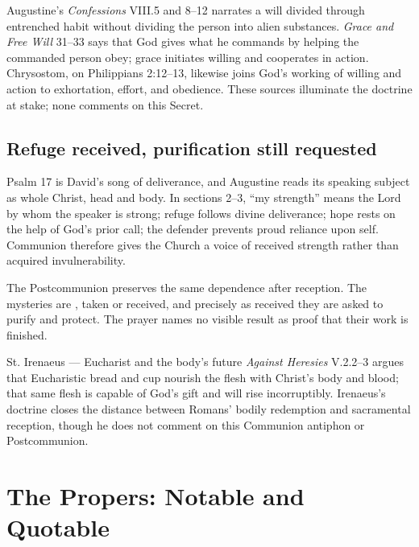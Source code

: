 Augustine's \emph{Confessions} VIII.5 and 8--12 narrates a will divided through entrenched habit without dividing the person into alien substances. \emph{Grace and Free Will} 31--33 says that God gives what he commands by helping the commanded person obey; grace initiates willing and cooperates in action. Chrysostom, on Philippians 2:12--13, likewise joins God's working of willing and action to exhortation, effort, and obedience. These sources illuminate the doctrine at stake; none comments on this Secret.

\sectionguard
\subsection*{Refuge received, purification still requested\enspace{}}

Psalm 17 is David's song of deliverance, and Augustine reads its speaking subject as whole Christ, head and body. In sections 2--3, ``my strength'' means the Lord by whom the speaker is strong; refuge follows divine deliverance; hope rests on the help of God's prior call; the defender prevents proud reliance upon self. Communion therefore gives the Church a voice of received strength rather than acquired invulnerability.

The Postcommunion preserves the same dependence after reception. The mysteries are , taken or received, and precisely as received they are asked to purify and protect. The prayer names no visible result as proof that their work is finished.

\begin{sourcecard}{St. Irenaeus --- Eucharist and the body's future}
\emph{Against Heresies} V.2.2--3 argues that Eucharistic bread and cup nourish the flesh with Christ's body and blood; that same flesh is capable of God's gift and will rise incorruptibly. Irenaeus's doctrine closes the distance between Romans' bodily redemption and sacramental reception, though he does not comment on this Communion antiphon or Postcommunion.
\end{sourcecard}

\sectionguard
\section*{The Propers: Notable and Quotable}

